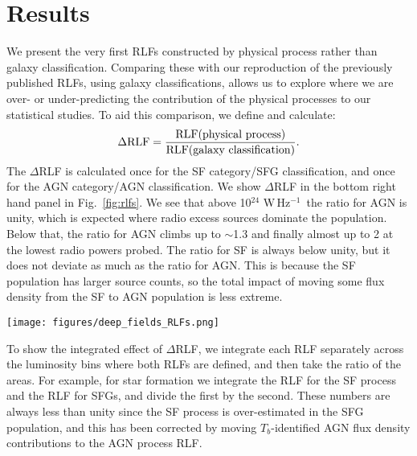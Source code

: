 \documentclass[usenatbib,fleqn,letters]{mnras}
\newcommand{\wphz}{$\,$W$\,$Hz$^{-1}$}
\begin{document}

\section{Results}
\label{sec:results}

We present the very first RLFs constructed by physical process rather than galaxy classification. Comparing these with our reproduction of the previously published RLFs, using galaxy classifications, allows us to explore where we are over- or under-predicting the contribution of the physical processes to our statistical studies. To aid this comparison, we define and calculate: 
\begin{equation}
\Delta\textrm{RLF} = \frac{\textrm{RLF(physical process)}}{\textrm{RLF(galaxy classification)}}. \notag
\end{equation}
The $\Delta$RLF is calculated once for the SF category/SFG classification, and once for the AGN category/AGN classification. We show $\Delta$RLF in the bottom right hand panel in Fig.~\ref{fig:rlfs}. We see that above 10$^{24}\,$\wphz\ the ratio for AGN is unity, which is expected where radio excess sources dominate the population. Below that, the ratio for AGN climbs up to $\sim$1.3 and finally almost up to 2 at the lowest radio powers probed. The ratio for SF is always below unity, but it does not deviate as much as the ratio for AGN. This is because the SF population has larger source counts, so the total impact of moving some flux density from the SF to AGN population is less extreme. 

\begin{figure*}
    \centering
    \texttt{[image: figures/deep\_fields\_RLFs.png]}
    \caption{\textit{Left:} Validation of our re-calculated galaxy RLFs (dotted lines) for the smaller area considered here with the previously published RLFs (solid lines). \textit{Middle:} RLFs calculated by process rather than galaxy. \textit{Right top:} RLFs calculated here by galaxy classifications (dotted lines) and by physical process (solid lines; orange for AGN and green for SF). \textit{Bottom right:} $\Delta$RLF for both AGN and star formation. }
    \label{fig:rlfs}
\end{figure*}

To show the integrated effect of $\Delta$RLF, we integrate each RLF separately across the luminosity bins where both RLFs are defined, and then take the ratio of the areas. For example, for star formation we integrate the RLF for the SF process and the RLF for SFGs, and divide the first by the second. These numbers are always less than unity since the SF process is over-estimated in the SFG population, and this has been corrected by moving $T_b$-identified AGN flux density contributions to the AGN process RLF. 
\end{document}
